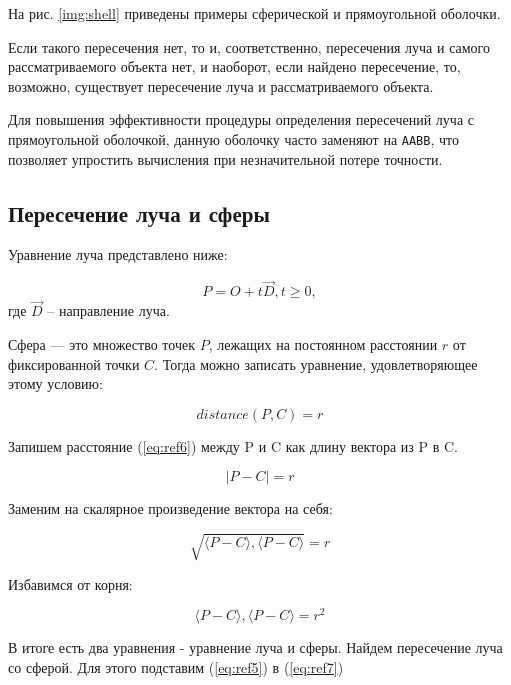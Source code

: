 На рис. \ref{img:shell} приведены примеры сферической и прямоугольной оболочки.


Если такого пересечения нет, то и, соответственно, пересечения луча и
самого рассматриваемого объекта нет, и наоборот, если найдено пересечение, то, возможно, существует пересечение луча и рассматриваемого объекта.

Для повышения эффективности процедуры определения пересечений луча с прямоугольной оболочкой, данную оболочку часто заменяют на \texttt{AABB}, что позволяет упростить вычисления при незначительной потере точности.

\subsection{Пересечение луча и сферы}

Уравнение луча представлено ниже:

\begin{equation}
	P = O + t\overrightarrow{D}, t \geq 0,
	\label{eq:ref5}
\end{equation}
где $\overrightarrow{D}$ -- направление луча.

Сфера — это множество точек $P$, лежащих на постоянном расстоянии $r$ от фиксированной точки $C$. Тогда можно записать уравнение, удовлетворяющее этому условию:

\begin{equation}
	distance(P,C) = r
	\label{eq:ref6}
\end{equation}

Запишем расстояние (\ref{eq:ref6}) между P и C как длину вектора из P в C.

\begin{equation}
	|P-C|=r
\end{equation}

Заменим на скалярное произведение вектора на себя:

\begin{equation}
	\sqrt{\langle P - C\rangle, \langle P - C\rangle} = r
\end{equation}

Избавимся от корня:

\begin{equation}
	\langle P - C\rangle, \langle P - C\rangle = r^2
	\label{eq:ref7}
\end{equation}

В итоге есть два уравнения - уравнение луча и сферы. Найдем пересечение луча со сферой. Для этого подставим (\ref{eq:ref5}) в (\ref{eq:ref7})

